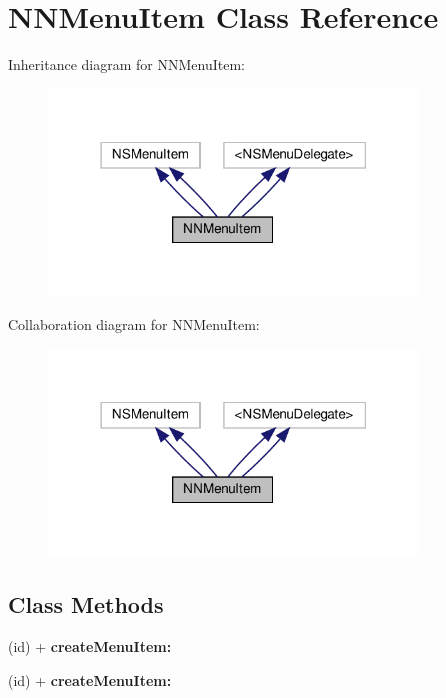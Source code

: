 \hypertarget{interfaceNNMenuItem}{}\section{N\+N\+Menu\+Item Class Reference}
\label{interfaceNNMenuItem}


Inheritance diagram for N\+N\+Menu\+Item\+:
\nopagebreak
\begin{figure}[H]
\begin{center}
\leavevmode
\includegraphics[width=278pt]{interfaceNNMenuItem__inherit__graph}
\end{center}
\end{figure}


Collaboration diagram for N\+N\+Menu\+Item\+:
\nopagebreak
\begin{figure}[H]
\begin{center}
\leavevmode
\includegraphics[width=278pt]{interfaceNNMenuItem__coll__graph}
\end{center}
\end{figure}
\subsection*{Class Methods}
\begin{DoxyCompactItemize}
\item 
\mbox{\label{interfaceNNMenuItem_ac83c75df3c89d736bdf8b73dbf2fb76f}} 
(id) + {\bfseries create\+Menu\+Item\+:}
\item 
\mbox{\label{interfaceNNMenuItem_ac83c75df3c89d736bdf8b73dbf2fb76f}} 
(id) + {\bfseries create\+Menu\+Item\+:}
\end{DoxyCompactItemize}
